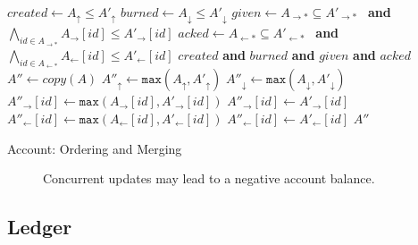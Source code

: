 \documentclass[9pt, oneside]{article}   	%
\begin{document}
\begin{algorithm}
\begin{algorithmic}[1]
     
        \State $\textit{created} \leftarrow A_\uparrow \leq A'_\uparrow$
        \State $\textit{burned} \leftarrow A_\downarrow \leq A'_\downarrow$
        \State $\textit{given} \leftarrow A_{\rightarrow *} \subseteq A'_{\rightarrow *}$ ~\textbf{and}~ $\bigwedge\limits_{id \in A_{\rightarrow *}} A_{\rightarrow}[id] \leq A'_{\rightarrow}[id]$ 
        \State $\textit{acked} \leftarrow A_{\leftarrow *} \subseteq A'_{\leftarrow *}$ ~\textbf{and}~ $\bigwedge\limits_{id \in A_{\leftarrow *}} A_{\leftarrow}[id] \leq A'_{\leftarrow}[id]$
        \State \Return $\textit{created}$ \textbf{and} $\textit{burned}$ \textbf{and} $\textit{given}$ \textbf{and} $\textit{acked}$
    \EndFunction
    \State
     
        \State $A'' \leftarrow \textit{copy}(A)$ 
        \State $A''_\uparrow \leftarrow \texttt{max}(A_\uparrow, A'_\uparrow)$
        \State $A''_\downarrow \leftarrow \texttt{max}(A_\downarrow, A'_\downarrow)$ 
        \State
			\State $A''_{\rightarrow}[id] \leftarrow \texttt{max}(A_{\rightarrow}[id], A'_{\rightarrow}[id])$
		\Else
			\State $A''_{\rightarrow}[id] \leftarrow A'_{\rightarrow}[id]$
		\EndIf
	\EndFor
	\State
			\State $A''_{\leftarrow}[id] \leftarrow \texttt{max}(A_{\leftarrow}[id], A'_{\leftarrow}[id])$
		\Else
			\State $A''_{\leftarrow}[id] \leftarrow A'_{\leftarrow}[id]$
		\EndIf
	\EndFor
	\State
	\State \Return $A''$	
    \EndFunction
\end{algorithmic}
\caption{\label{alg:account-ordering} Account: Ordering and Merging}
\end{algorithm}




\begin{figure}

\caption{Concurrent updates may lead to a negative account balance.}
\label{fig:account-negative-bal}
\end{figure}


\subsection{Ledger}
\label{sec:ledger}
\end{document}
